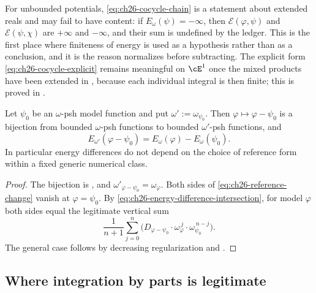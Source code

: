 \begin{remark}
\label{rem:ch26-cocycle-caution}
For unbounded potentials, \eqref{eq:ch26-cocycle-chain} is a statement about
extended reals and may fail to have content: if
\(E_\omega(\psi)=-\infty\), then \(\mathcal E(\varphi,\psi)\) and
\(\mathcal E(\psi,\chi)\) are \(+\infty\) and \(-\infty\), and their sum is
undefined by the ledger.  This is the first place where finiteness of energy
is used as a hypothesis rather than as a conclusion, and it is the reason
 normalizes before subtracting.  The
explicit form \eqref{eq:ch26-cocycle-explicit} remains meaningful on
\(\cE^1\) once the mixed products have been extended in
, because each individual integral is then
finite; this is proved in .
\end{remark}

\begin{proposition}
\label{prop:ch26-reference-change}
Let \(\psi_0\) be an \(\omega\)-psh model function and put
\(\omega':=\omega_{\psi_0}\).  Then \(\varphi\mapsto\varphi-\psi_0\) is a
bijection from bounded \(\omega\)-psh functions to bounded
\(\omega'\)-psh functions, and
\begin{equation}
\label{eq:ch26-reference-change}
 E_{\omega'}(\varphi-\psi_0)
 =E_\omega(\varphi)-E_\omega(\psi_0).
\end{equation}
In particular energy differences do not depend on the choice of reference
form within a fixed generic numerical class.
\end{proposition}

\begin{proof}
The bijection is , and
\(\omega'_{\varphi-\psi_0}=\omega_\varphi\).  Both sides of
\eqref{eq:ch26-reference-change} vanish at \(\varphi=\psi_0\).  By
\eqref{eq:ch26-energy-difference-intersection}, for model \(\varphi\) both
sides equal the legitimate vertical sum
\[
 \frac1{n+1}\sum_{j=0}^n
 \bigl(D_{\varphi-\psi_0}\cdot\omega_\varphi^{\,j}
                  \cdot\omega_{\psi_0}^{\,n-j}\bigr).
\]
The general case follows by decreasing
regularization and .
\end{proof}

\subsection{Where integration by parts is legitimate}
\label{sec:ch26-ibp-scope}

